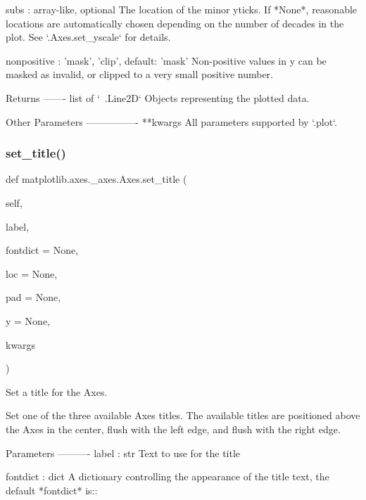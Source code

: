 \begin{DoxyVerb}
\begin{DoxyVerb}
subs : array-like, optional
    The location of the minor yticks. If *None*, reasonable locations
    are automatically chosen depending on the number of decades in the
    plot. See `.Axes.set_yscale` for details.

nonpositive : {'mask', 'clip'}, default: 'mask'
    Non-positive values in y can be masked as invalid, or clipped to a
    very small positive number.

Returns
-------
list of `~.Line2D`
    Objects representing the plotted data.

Other Parameters
----------------
**kwargs
    All parameters supported by `.plot`.
\end{DoxyVerb}
 \mbox{\label{classmatplotlib_1_1axes_1_1__axes_1_1Axes_ae727bef0fa6139389f8120c77bfb2569}} 
\subsubsection{\texorpdfstring{set\+\_\+title()}{set\_title()}}
{\footnotesize\ttfamily def matplotlib.\+axes.\+\_\+axes.\+Axes.\+set\+\_\+title (\begin{DoxyParamCaption}\item[{}]{self,  }\item[{}]{label,  }\item[{}]{fontdict = {\ttfamily None},  }\item[{}]{loc = {\ttfamily None},  }\item[{}]{pad = {\ttfamily None},  }\item[{}]{y = {\ttfamily None},  }\item[{}]{kwargs }\end{DoxyParamCaption})}

\begin{DoxyVerb}Set a title for the Axes.

Set one of the three available Axes titles. The available titles
are positioned above the Axes in the center, flush with the left
edge, and flush with the right edge.

Parameters
----------
label : str
    Text to use for the title

fontdict : dict
    A dictionary controlling the appearance of the title text,
    the default *fontdict* is::


\end{DoxyVerb}
\end{DoxyVerb}
